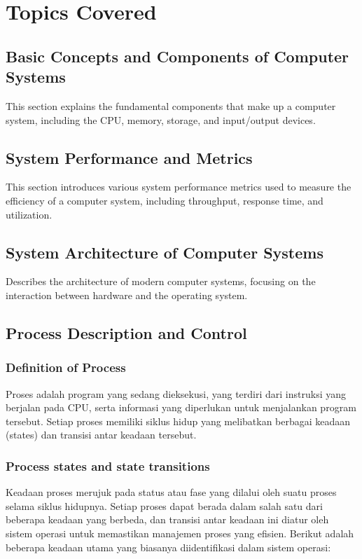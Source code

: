\documentclass[12pt]{article}
\begin{document}
\section{Topics Covered}

\subsection{Basic Concepts and Components of Computer Systems}
This section explains the fundamental components that make up a computer system, including the CPU, memory, storage, and input/output devices.

\subsection{System Performance and Metrics}
This section introduces various system performance metrics used to measure the efficiency of a computer system, including throughput, response time, and utilization.

\subsection{System Architecture of Computer Systems}
Describes the architecture of modern computer systems, focusing on the interaction between hardware and the operating system.

\subsection{Process Description and Control}
\subsubsection{Definition of Process}
Proses adalah program yang sedang dieksekusi, yang terdiri dari instruksi yang berjalan pada CPU, serta informasi yang diperlukan untuk menjalankan program tersebut. Setiap proses memiliki siklus hidup yang melibatkan berbagai keadaan (states) dan transisi antar keadaan tersebut.

\subsubsection{Process states and state transitions}
Keadaan proses merujuk pada status atau fase yang dilalui oleh suatu proses selama siklus hidupnya. Setiap proses dapat berada dalam salah satu dari beberapa keadaan yang berbeda, dan transisi antar keadaan ini diatur oleh sistem operasi untuk memastikan manajemen proses yang efisien. Berikut adalah beberapa keadaan utama yang biasanya diidentifikasi dalam sistem operasi:
\end{document}
